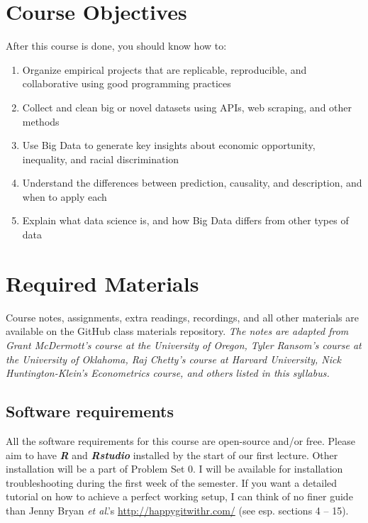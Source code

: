 \documentclass[11pt]{article}
\begin{document}
\section*{Course Objectives}

After this course is done, you should know how to:

\begin{enumerate}
\item Organize empirical projects that are replicable, reproducible, and collaborative using good programming practices
\item Collect and clean big or novel datasets using APIs, web scraping, and other methods
\item Use Big Data to generate key insights about economic opportunity, inequality, and racial discrimination
\item Understand the differences between prediction, causality, and description, and when to apply each
\item Explain what data science is, and how Big Data differs from other types of data 
\end{enumerate}


\section*{Required Materials}
\label{sec:materials}

Course notes, assignments, extra readings, recordings, and all other materials are available on the GitHub class materials repository. \textit{The notes are adapted from Grant McDermott's course at the University of Oregon, Tyler Ransom's course at the University of Oklahoma, Raj Chetty's course at Harvard University, Nick Huntington-Klein's Econometrics course, and others listed in this syllabus.}

\subsection*{Software requirements}

All the software requirements for this course are open-source and/or free. Please aim to have \textbf{\textit{R}} and \textbf{\textit{Rstudio}} installed by the start of our first lecture. Other installation will be a part of Problem Set 0. I will be available for installation troubleshooting during the first week of the semester. If you want a detailed tutorial on how to achieve a perfect working setup, I can think of no finer guide than Jenny Bryan \textit{et al}.'s \url{http://happygitwithr.com/} (see esp. sections 4 -- 15).
\end{document}

